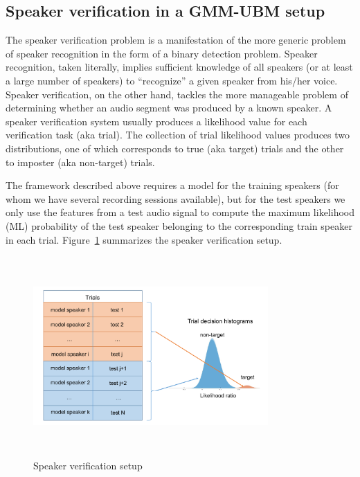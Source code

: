 \subsection{Speaker verification in a GMM-UBM setup} 
\label{ssec:ch3_GMMUBM}
The speaker verification problem is a manifestation of the more generic problem of speaker recognition in the form of a binary detection problem. 
Speaker recognition, taken literally, implies sufficient knowledge of all speakers (or at least a large number of speakers) to ``recognize'' a given speaker from his/her voice. 
Speaker verification, on the other hand, tackles the more manageable problem of determining whether an audio segment was produced by a known speaker. 
A speaker verification system usually produces a likelihood value for each verification task (aka trial). 
The collection of trial likelihood values produces two distributions, one of which corresponds to true (aka target) trials and the other to imposter (aka non-target) trials. 

The framework described above requires a model for the training speakers (for whom we have several recording sessions available), but for the test speakers we only use the features from a test audio signal to compute the maximum likelihood (ML) probability of the test speaker belonging to the corresponding train speaker in each trial. 
Figure~\ref{fig:ch3_speaker_verification} summarizes the speaker verification setup. 

\begin{figure}[h!]
	\centering
	\vspace{0mm}
	\includegraphics[height = 3in, width=0.8\textwidth]{figures/speaker_verification_setup}
	\vspace{-3mm}
	\caption{ Speaker verification setup}
	\label{fig:ch3_speaker_verification}
	\vspace{0mm}
\end{figure}

